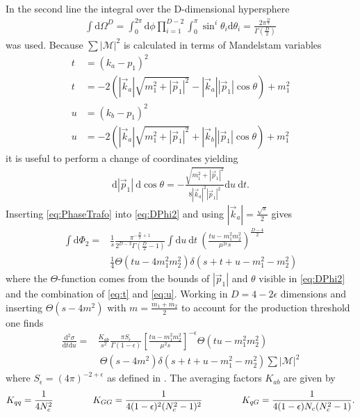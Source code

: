 In the second line the integral over the D-dimensional hypersphere 
\begin{align}
\int \mathrm{d}\Omega^D = \int_0^{2\pi} \mathrm{d}\phi \prod_{i=1}^{D-2}\int_0^\pi \sin^i\theta_i \mathrm{d}\theta_i = \frac{2\pi^{\frac{D}{2}}}{\Gamma(\frac{D}{2})}
\end{align}
was used. Because $\sum|\mathcal{M}|^2$ is calculated in terms of Mandelstam variables 
\begin{align}
t &= (k_a-p_1)^2  \nonumber\\
t &= -2\left(|\vec{k}_a| \sqrt{m_1^2 + |\vec{p}_1|^2} - |\vec{k}_a||\vec{p}_1| \cos\theta\right) + m_1^2\label{eq:t} \\
u &= (k_b-p_1)^2\nonumber\\
u &= -2\left(|\vec{k}_a| \sqrt{m_1^2 + |\vec{p}_1|^2} + |\vec{k}_b||\vec{p}_1| \cos\theta\right) + m_1^2\label{eq:u}
\end{align}
it is useful to perform a change of coordinates yielding
\begin{align}
\mathrm{d}|\vec{p}_1|\ \mathrm{d}\cos\theta = -\frac{\sqrt{m_1^2+|\vec{p}_1|^2}}{8|\vec{k}_a|^2|\vec{p}_1|^2}\mathrm{d}u\ \mathrm{d}t.\label{eq:PhaseTrafo}
\end{align}
Inserting \ref{eq:PhaseTrafo} into \ref{eq:DPhi2} and using $|\vec{k}_a| = \frac{\sqrt{s}}{2}$ gives
\begin{align}
\int \mathrm{d}\Phi_2 = & \frac{1}{s} \frac{\pi^{-\frac{D}{2}+1}}{2^{D-3}\Gamma(\frac{D}{2}-1)} \int \mathrm{d}u\ \mathrm{d}t\ \left( \frac{tu-m_1^2m_2^2}{\mu^{2\epsilon} s} \right)^{\frac{D-4}{2}} \nonumber\\
&\frac{1}{4}\Theta(tu-4m_1^2m_2^2)\delta \left(s+t+u-m_1^2-m_2^2\right)
\end{align}
where the $\Theta$-function comes from the bounds of $|\vec{p}_1|$ and $\theta$ visible in \ref{eq:DPhi2} and the combination of \ref{eq:t} and \ref{eq:u}. Working in $D=4-2\epsilon$ dimensions and inserting $\Theta(s-4m^2)$ with $m = \frac{m_1 + m_2}{2}$ to account for the production threshold one finds
\begin{align}
\frac{\mbox{d}^2 \sigma}{\mbox{d}t\mbox{d}u} =& \frac{K_{ab}}{s^2} \frac{\pi S_{\epsilon}}{\Gamma(1-\epsilon)} \left[ \frac{tu-m_1^2m_2^2}{\mu^2 s}\right]^{-\epsilon} \Theta(tu-m_1^2m_2^2)\nonumber\\
&\ \Theta(s-4m^2) \delta(s+t+u-m_1^2-m_2^2) \sum |\mathcal{M}|^2
\end{align}
where $S_\epsilon = (4\pi)^{-2+\epsilon}$ as defined in \cite{Beenakker:1996ch}.
The averaging factors $K_{ab}$ are given by
\begin{align}
K_{qq} = \frac{1}{4N_c^2} \hspace{1.5cm}K_{GG} = \frac{1}{4(1-\epsilon)^2(N_c^2-1)^2} \hspace{1.5cm}K_{qG} = \frac{1}{4(1-\epsilon)N_c(N_c^2-1)}.
\end{align}

